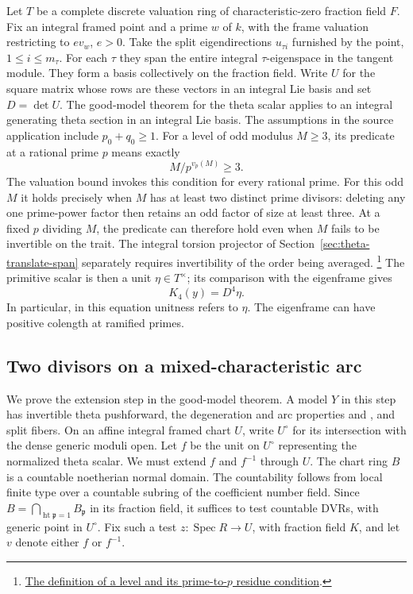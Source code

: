 Let \(T\) be a complete discrete valuation ring of characteristic-zero
fraction field \(F\). Fix an integral framed point and a prime
\(w\) of \(k\), with the frame valuation restricting to \(e v_w\),
\(e>0\). Take the split eigendirections \(u_{\tau i}\) furnished by
the point, \(1\le i\le m_\tau\). For each \(\tau\) they span the
entire integral \(\tau\)-eigenspace in the tangent module. They
form a basis collectively on the fraction field. Write \(U\) for
the square matrix whose rows are these vectors in an integral Lie
basis and set \(D=\det U\). The good-model theorem for the theta
scalar applies to an integral generating theta section in an
integral Lie basis. The assumptions in the source application
include \(p_0+q_0\ge1\). For a level of odd modulus
\(M\ge3\), its predicate  at a rational prime \(p\)
means exactly
\[
                    M/p^{v_p(M)}\ge3 .
\]
The valuation bound invokes this condition for every rational
prime. For this odd \(M\) it holds precisely when \(M\) has
at least two distinct prime divisors: deleting any one prime-power
factor then retains an odd factor of size at least three. At a
fixed \(p\) dividing \(M\), the predicate can therefore hold even
when \(M\) fails to be invertible on the trait. The integral
torsion projector of Section~\ref{sec:theta-translate-span} separately
requires invertibility of the order being averaged.
\footnote{\href{https://github.com/ChristianKudeba/alpoge-rh-verification/blob/alpoge-source-7cbf7a0c/src/ReciprocityTheory/ReductiveGroups/ArithmeticGeometry/BirationalGeometry/ToroidalCompactification/TwoWeightEqOneAddRoot.lean}{The definition of a level and its prime-to-\(p\) residue condition}.}
The primitive scalar is then a unit \(\eta\in T^\times\); its comparison with the eigenframe
gives
\[
                            K_4(y)=D^4\eta .
\]
In particular, in this equation unitness refers to \(\eta\).
The eigenframe can have positive colength at ramified primes.

\subsection{Two divisors on a mixed-characteristic arc}

We prove the extension step in the good-model theorem. A model \(Y\)
in this step has invertible theta pushforward, the degeneration
and arc properties  and , and split fibers.
On an affine integral framed chart \(U\), write \(U^\circ\) for its
intersection with the dense generic moduli open. Let \(f\) be the
unit on \(U^\circ\) representing the normalized theta scalar.
We must extend \(f\) and \(f^{-1}\) through \(U\).
The chart ring \(B\) is a countable noetherian normal domain. The
countability follows from local finite type over a countable subring
of the coefficient number field. Since
\(B=\bigcap_{\operatorname{ht}\mathfrak p=1} B_{\mathfrak p}\)
in its fraction field, it suffices to test countable DVRs, with
generic point in \(U^\circ\). Fix such a test \(z:\operatorname{Spec}R
\to U\), with fraction field \(K\), and let \(v\) denote either \(f\)
or \(f^{-1}\).

